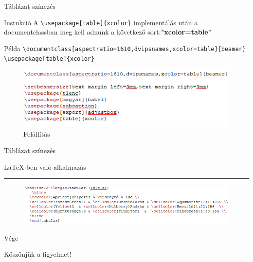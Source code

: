 \documentclass[aspectratio=1610,dvipsnames,xcolor=table]{beamer}
\begin{document}
\begin{frame}[fragile]{Táblázat színezés}
	\onslide<1->\begin{block}{Instukció}
 		A \verb!\usepackage[table]{xcolor}! implementálás után a documentclassban meg 				kell adnunk a következő sort:\textbf{"xcolor=table"}
	\end{block} 
	\begin{exampleblock}{Példa}
    {
       \verb!\documentclass[aspectratio=1610,dvipsnames,xcolor=table]{beamer}!
       \verb!\usepackage[table]{xcolor}!
    }
    \end{exampleblock}	
    \begin{figure}[H]
			 \includegraphics[scale=0.8]{img/tablesetup.png}
			 \onslide<2->\caption{Felállítás}
	\end{figure}
\end{frame}

\begin{frame}[fragile]{Táblázat színezés}
\begin{center}
\LaTeX-ben való alkalmazás
\noindent
{\color{Dandelion} \rule{\linewidth}{1mm}}
\end{center}
	\begin{figure}[H]
		\includegraphics[scale=0.8]{img/tablealkalmazas.png}
			 
	\end{figure}
\end{frame}

\begin{frame}[fragile]{Vége}
\begin{center}
\Huge Köszönjük a figyelmet!
\end{center}
\end{frame}
\end{document}
